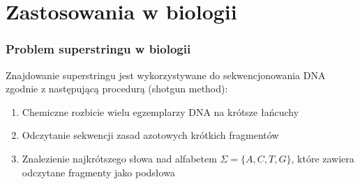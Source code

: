 \documentclass[10pt]{beamer}
\begin{document}
  \section{Zastosowania w biologii}
  \frame
  {
    \frametitle{Problem superstringu w biologii}
    Znajdowanie superstringu jest wykorzystywane do sekwencjonowania DNA zgodnie z następującą procedurą (shotgun method):
    \begin{enumerate}
      \item <1-> Chemiczne rozbicie wielu egzemplarzy DNA na krótsze łańcuchy
      \item <2-> Odczytanie sekwencji zasad azotowych krótkich fragmentów
      \item <3-> Znalezienie najkrótszego słowa nad alfabetem $\Sigma = \{A, C, T, G\}$, 
          które zawiera odczytane fragmenty jako podsłowa
    \end{enumerate}
  }
\end{document}
